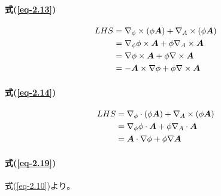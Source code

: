 \documentclass[a4paper,uplatex,dvi=dvipdfmx,ja=standard]{bxjsarticle}
\newcommand{\bm}[1]{{\mbox{\boldmath $#1$}}}
\numberwithin{equation}{section}
\begin{document}
\paragraph{式(\ref{eq-2.13})}
\begin{align*}
  LHS &= \nabla_{\phi}\times(\phi\bm{A})+\nabla_A\times(\phi\bm{A}) \\
  &= \nabla_{\phi}\phi\times\bm{A}+\phi\nabla_A\times\bm{A} \\
  &= \nabla\phi\times\bm{A}+\phi\nabla\times\bm{A} \\
  &= -\bm{A}\times\nabla\phi+\phi\nabla\times\bm{A}
\end{align*}
\paragraph{式(\ref{eq-2.14})}
\begin{align*}
  LHS &= \nabla_{\phi}\cdot(\phi\bm{A})+\nabla_A\times(\phi\bm{A}) \\
  &= \nabla_{\phi}\phi\cdot\bm{A}+\phi\nabla_A\cdot\bm{A} \\
  &= \bm{A}\cdot\nabla\phi+\phi\nabla\bm{A}
\end{align*}
\paragraph{式(\ref{eq-2.19})}
式(\ref{eq-2.10})より。
\end{document}
